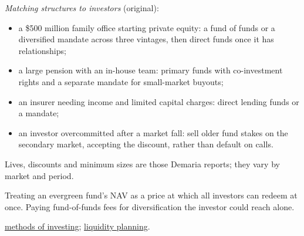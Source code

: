 \begin{qfmethod}
 \emph{Matching structures to investors} (original):
\begin{itemize}
\item a \$500 million family office starting private equity: a fund of funds or a diversified mandate across three vintages, then direct funds once it has relationships;
\item a large pension with an in-house team: primary funds with co-investment rights and a separate mandate for small-market buyouts;
\item an insurer needing income and limited capital charges: direct lending funds or a mandate;
\item an investor overcommitted after a market fall: sell older fund stakes on the secondary market, accepting the discount, rather than default on calls.
\end{itemize}

 Lives, discounts and minimum sizes are those Demaria reports; they vary by market and period.

 Treating an evergreen fund's NAV as a price at which all investors can redeem at once. Paying fund-of-funds fees for diversification the investor could reach alone.

 \hyperref[def:alternative-investment-categories]{methods of investing}; \hyperref[meth:alternatives-allocation-approaches]{liquidity planning}.

\end{qfmethod}
